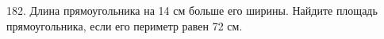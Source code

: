 182. Длина прямоугольника на 14 см больше его ширины. Найдите площадь прямоугольника, если его периметр равен 72 см.\\
